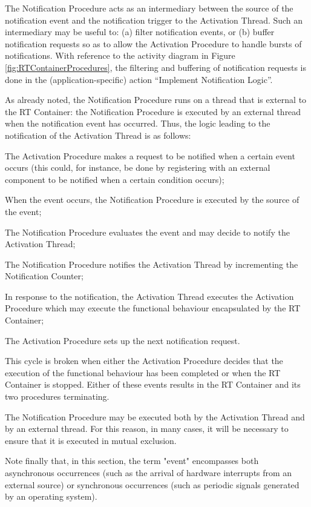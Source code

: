 The Notification Procedure acts as an intermediary
between the source of the notification event and the notification trigger to the Activation
Thread. Such an intermediary may be useful to: (a) filter notification events, or (b) buffer
notification requests so as to allow the Activation Procedure to handle bursts of notifications.
With reference to the activity diagram in Figure \ref{fig:RTContainerProcedures}, the filtering 
and buffering of notification requests is done in the (application-specific) action “Implement Notification Logic”.

As already noted, the Notification Procedure runs on a thread that is external to the RT
Container: the Notification Procedure is executed by an external thread when the notification
event has occurred. Thus, the logic leading to the notification of the Activation Thread is as
follows:

\begin{fw_enumerate}
\item The Activation Procedure makes a request to be notified when a certain event occurs
(this could, for instance, be done by registering with an external component to be
notified when a certain condition occurs);
\item When the event occurs, the Notification Procedure is executed by the source of the
event;
\item The Notification Procedure evaluates the event and may decide to notify the
Activation Thread;
\item The Notification Procedure notifies the Activation Thread by incrementing the Notification Counter;
\item In response to the notification, the Activation Thread executes the Activation Procedure which may execute the
functional behaviour encapsulated by the RT Container;
\item The Activation Procedure sets up the next notification request.

\end{fw_enumerate}

This cycle is broken when either the Activation Procedure decides that the execution of the
functional behaviour has been completed or when the RT Container is stopped. Either of these
events results in the RT Container and its two procedures terminating.

The Notification Procedure may be executed both by the Activation Thread and by an external thread. For this reason, in many cases, it will be necessary to ensure that it is executed in mutual exclusion.

Note finally that, in this section, the term "event" encompasses both asynchronous occurrences (such as the arrival of hardware interrupts from an external source) or synchronous occurrences (such as periodic signals generated by an operating system). 